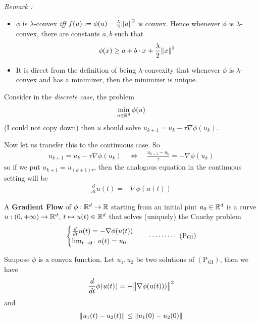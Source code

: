 \documentclass[12pt,a4paper]{article}
\begin{document}
\emph{Remark :}
\begin{itemize}
\item $\phi$ is $\lambda$-convex \emph{iff} $f(u) := \phi(u) - \frac{\lambda}{2} \snorms{u}{}^2$ is convex. Hence whenever $\phi$ is $\lambda$-convex, there are constants $a,b$ such that
\begin{align*}
\phi(x) \geq a+ b\cdot x + \frac{\lambda}{2} \snorms{x}{}^2
\end{align*}
\item It is direct from the definition of being $\lambda$-convexity that whenever $\phi$ is $\lambda$-convex and has a minimizer, then the minimizer is unique.
\end{itemize} 
\s

Consider in the \emph{discrete case}, the problem
\begin{align*}
\min_{u\in \mathbb{R}^d} \phi(u)
\end{align*}
(I could not copy down) then $u$ should solve $u_{k+1} = u_k - \tau \nabla \phi(u_k)$.
\s

Now let us transfer this to the continuous case. So
\begin{align*}
u_{k+1} = u_k - \tau \nabla \phi(u_k) \quad \Leftrightarrow \quad \frac{u_{k+1} - u_k}{\tau} = - \nabla \phi(u_k)
\end{align*}
so if we put $u_{k+1} = u_{(k+1)\tau}$, then the analogous equation in the continuous setting will be
\begin{align*}
\frac{d}{dt} u(t) = - \nabla \phi(u(t))
\end{align*}
\s

 A \textbf{Gradient Flow} of $\phi : \mathbb{R}^d \rightarrow \mathbb{R}$ starting from an initial pint $u_0 \in \mathbb{R}^d$ is a curve $u: (0, +\infty) \rightarrow \mathbb{R}^d$, $t \mapsto u(t) \in \mathbb{R}^d$ that solves (uniquely) the Cauchy problem
\begin{align*}
\begin{cases}
\frac{d}{dt} u(t) = - \nabla \phi(u(t)) \\
\lim_{t\rightarrow 0^+} u(t) = u_0 
\end{cases} \quad \cdots\cdots\cdots\,\,(\text{P}_{\text{GI}})
\end{align*}
\s

\newcommand{\pgi}{\text{P}_{\text{GI}}}

 Suupose $\phi$ is a convex function. Let $u_1, u_2$ be two solutions of $(\pgi)$, then we have
\begin{align*}
\frac{d}{dt} \phi(u(t)) = -\bigl\lVert\nabla \phi(u(t)))\bigr\rVert_{}^2
\end{align*}
and
\begin{align*}
\snorms{u_1(t) - u_2(t)}{} \leq \snorms{u_1(0)- u_2(0)}{}
\end{align*}
\end{document}
